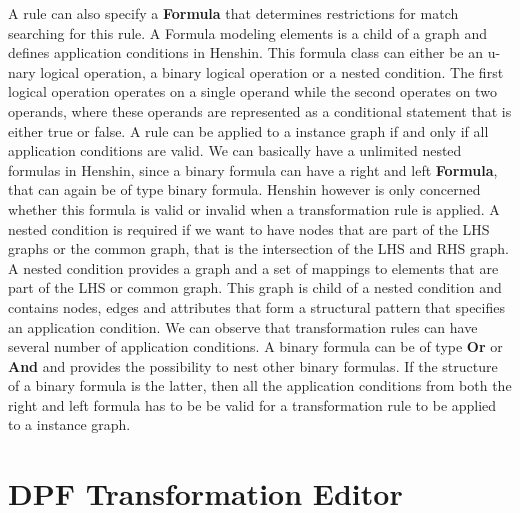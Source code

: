 A rule can also specify a \textbf{Formula} that determines restrictions for
match searching for this rule. A Formula modeling elements is a child of a graph
and defines application conditions in Henshin. This formula class can either be
an u-nary logical operation, a binary logical operation or a nested condition.
The first logical operation operates on a single operand while the second
operates on two operands, where these operands are represented as a conditional
statement that is either true or false. A rule can be applied to a instance
graph if and only if all application conditions are valid. We can basically
have a unlimited nested formulas in Henshin, since a binary formula can have a
right and left \textbf{Formula}, that can again be of type binary formula.
Henshin however is only concerned whether this formula is valid or invalid when
a transformation rule is applied. A nested condition is required if we want to
have nodes that are part of the LHS graphs or the common graph, that is the
intersection of the LHS and RHS graph. A nested condition provides a graph and
a set of mappings to elements that are part of the LHS or common graph. This
graph is child of a nested condition and contains nodes, edges and attributes
that form a structural pattern that specifies an application condition. We can
observe that transformation rules can have several number of application
conditions. A binary formula can be of type \textbf{Or} or \textbf{And} and
provides the possibility to nest other binary formulas. If the structure of a
binary formula is the latter, then all the application conditions from both the
right and left formula has to be be valid for a transformation rule to be
applied to a instance graph.

\section{DPF Transformation Editor}

